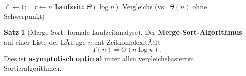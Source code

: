 ﻿\documentclass[a4paper,12pt]{report}
\theoremstyle{definition}
\newtheorem{satz}{Satz}
\begin{document}
\begin{algorithm}[H]
\DontPrintSemicolon
\caption{BinÃ¤rsuche}\label{alg:binsearch}
$\ell \leftarrow 1;\quad r \leftarrow n$\;
\;
\BlankLine
\textbf{Laufzeit:} $\Theta(\log n)$ Vergleiche \quad (vs.\ $\Theta(n)$ ohne Schwerpunkt)
\end{algorithm}

\begin{satz}[Merge-Sort: formale Laufzeitanalyse]
    \label{satz:mergesort}
    Der \textbf{Merge-Sort-Algorithmus} auf einer Liste der LÃ¤nge $n$
    hat ZeitkomplexitÃ¤t
    \[
        T(n) = \Theta(n \log n).
    \]
    Dies ist \textbf{asymptotisch optimal} unter allen
    vergleichsbasierten Sortieralgorithmen.
\end{satz}
\end{document}
